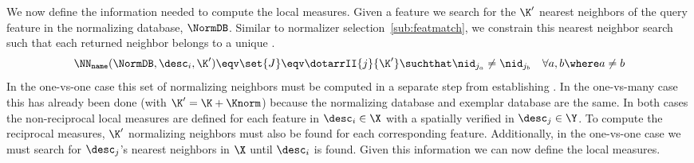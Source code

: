            \newcommand{\Jname}{\set{J}}
            We now define the information needed to compute the local
              measures.
            Given a feature \correspondence{} we search for the $\K'$ nearest
              neighbors of the query feature in the normalizing database,
              $\NormDB$.
            Similar to normalizer selection~\cref{sub:featmatch}, we constrain
              this nearest neighbor search such that each returned neighbor
              belongs to a unique \name{}.
            \begin{equation}
                \NN_{\tt{name}}(\NormDB, \desc_i, \K') \eqv
                \Jname \eqv
                \dotarrII{j}{\K'} \suchthat
                    \nid_{j_a} \neq \nid_{j_b} \quad
                    \forall a, b \where a \neq b
            \end{equation}
            In the one-vs-one case this set of normalizing neighbors must be
              computed in a separate step from establishing \correspondences{}.
            In the one-vs-many case this has already been done (with $\K' = \K
              + \Knorm$) because the normalizing database and exemplar database
              are the same.
            In both cases the non-reciprocal local measures are defined for
              each feature in $\desc_i \in \X$ with a spatially verified
              \correspondence{} in $\desc_j \in \Y$.
            To compute the reciprocal measures, $\K'$ normalizing neighbors
              must also be found for each corresponding feature.
            Additionally, in the one-vs-one case we must search for
              $\desc_j$'s nearest neighbors in $\X$ until $\desc_i$ is found.
            Given this information we can now define the local measures.

